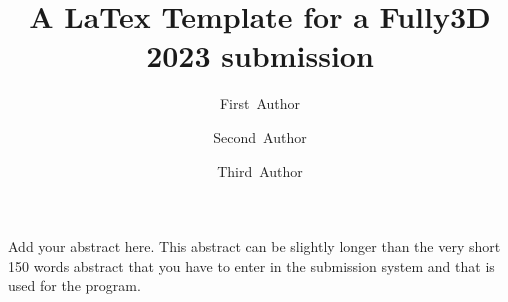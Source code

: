 \documentclass[11pt,twocolumn,twoside]{article}
\begin{document}
\title{A LaTex Template for a Fully3D 2023 submission} 

\author[1]{First~Author}
\author[1,2]{Second~Author}
\author[2]{Third~Author}



\maketitle
\thispagestyle{fancy}





\begin{customabstract}
Add your abstract here. This abstract can be slightly longer than the very short 
150 words abstract that you have to enter in the submission system and that is used 
for the program. 
\end{customabstract}






\printbibliography
\end{document}
